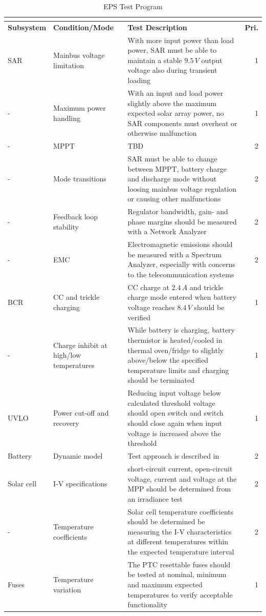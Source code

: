 \begin{center}
\begin{longtable}[H]{p{}p{}p{}r}
\caption{EPS Test Program}\\
\label{tab:test_program}\\[-0.5cm]
\hline
\textbf{Subsystem} & \textbf{Condition/Mode} & \textbf{Test Description} & \textbf{Pri.}\\
\hline
\ac{SAR} & Mainbus voltage limitation & With more input power than load power, \ac{SAR} must be able to maintain a stable $9.5\,V$ output voltage also during transient loading & 1\\
- & Maximum power handling & With an input and load power slightly above the maximum expected solar array power, no \ac{SAR} components must overheat or otherwise malfunction & 1 \\
- & \ac{MPPT} & \ac{TBD} & 2\\
- & Mode transitions & \ac{SAR} must be able to change between \ac{MPPT}, battery charge and discharge mode without loosing mainbus voltage regulation or causing other malfunctions & 2\\
- & Feedback loop stability & Regulator bandwidth, gain- and phase margins should be measured with a Network Analyzer & 2\\
- & \ac{EMC} & Electromagnetic emissions should be measured with a Spectrum Analyzer, especially with concerns to the telecommunication systems & 2\\
\hline
\ac{BCR} & \ac{CC} and trickle charging & \ac{CC} charge at $2.4\,A$ and trickle charge mode entered when battery voltage reaches $8.4\,V$ should be verified & 1\\
- & Charge inhibit at high/low temperatures & While battery is charging, battery thermistor is heated/cooled in thermal oven/fridge to slightly above/below the specified temperature limits and charging should be terminated & 1\\
\hline
\ac{UVLO} & Power cut-off and recovery & Reducing input voltage below calculated threshold voltage should open switch and switch should close again when input voltage is increased above the threshold & 1\\
\hline
Battery & Dynamic model & Test approach is described in \cite{chen} & 2\\
\hline
Solar cell & I-V specifications & short-circuit current, open-circuit voltage, current and voltage at the \ac{MPP} should be determined from an irradiance test & 2\\
- & Temperature coefficients & Solar cell temperature coefficients should be determined be measuring the I-V characteristics at different temperatures within the expected temperature interval & 2\\
\hline
Fuses & Temperature variation & The \ac{PTC} resettable fuses should be tested at nominal, minimum and maximum expected temperatures to verify acceptable functionality & 1\\
\hline
\end{longtable}
\end{center}
%